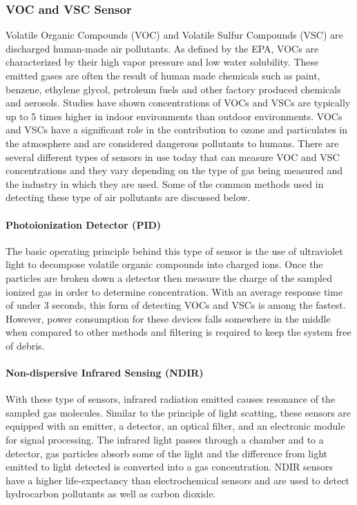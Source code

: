 \subsubsection{VOC and VSC Sensor}
Volatile Organic Compounds (VOC) and Volatile Sulfur Compounds (VSC) are discharged human-made air pollutants. As defined by the EPA, VOCs are characterized by their high vapor pressure and low water solubility. These emitted gases are often the result of human made chemicals such as paint, benzene, ethylene glycol, petroleum fuels and other factory produced chemicals and aerosols. Studies have shown concentrations of VOCs and VSCs are typically up to 5 times higher in indoor environments than outdoor environments. VOCs and VSCs have a significant role in the contribution to ozone and particulates in the atmosphere and are considered dangerous pollutants to humans. There are several different types of sensors in use today that can measure VOC and VSC concentrations and they vary depending on the type of gas being measured and the industry in which they are used. Some of the common methods used in detecting these type of air pollutants are discussed below.

\paragraph{Photoionization Detector (PID)}
The basic operating principle behind this type of sensor is the use of ultraviolet light to decompose volatile organic compounds into charged ions. Once the particles are broken down a detector then measure the charge of the sampled ionized gas in order to determine concentration. With an average response time of under 3 seconds, this form of detecting VOCs and VSCs is among the fastest. However, power consumption for these devices falls somewhere in the middle when compared to other methods and filtering is required to keep the system free of debris. 

\paragraph{Non-dispersive Infrared Sensing (NDIR)}
With these type of sensors, infrared radiation emitted causes resonance of the sampled gas molecules. Similar to the principle of light scatting, these sensors are equipped with an emitter, a detector, an optical filter, and an electronic module for signal processing. The infrared light passes through a chamber and to a detector, gas particles absorb some of the light and the difference from light emitted to light detected is converted into a gas concentration. NDIR sensors have a higher life-expectancy than electrochemical sensors and are used to detect hydrocarbon pollutants as well as carbon dioxide. 

